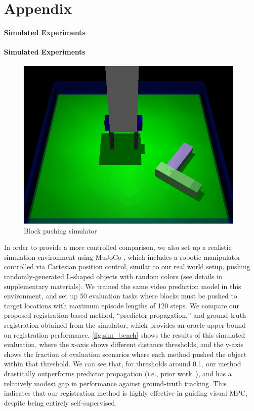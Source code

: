 \part*{Appendix}

\subsection*{Simulated Experiments}


\subsection*{Simulated Experiments}

\begin{figure}
	\centering
	\includegraphics[width=0.3\columnwidth]{images/simulator.png}
	\caption{\small{Block pushing simulator}}
	\label{fig:sim}
\end{figure}

In order to provide a more controlled comparison, we also set up a realistic simulation environment using MuJoCo \cite{todorov2012mujoco}, which includes a robotic manipulator controlled via Cartesian position control, similar to our real world setup, pushing randomly-generated L-shaped objects with random colors (see details in supplementary materials). 
We trained the same video prediction model in this environment, and set up 50 evaluation tasks where blocks must be pushed to target locations with maximum episode lengths of 120 steps. 
We  compare our proposed registration-based method, ``predictor propagation,'' and ground-truth registration obtained from the simulator, which provides an oracle upper bound on registration performance. \autoref{fig:sim_bench} shows the results of this simulated evaluation, where the x-axis shows different distance thresholds, and the y-axis shows the fraction of evaluation scenarios where each method pushed the object within that threshold. We can see that, for thresholds around 0.1, our method drastically outperforms predictor propagation (i.e., prior work~\cite{sna}), and has a relatively modest gap in performance against ground-truth tracking. This indicates that our registration method is highly effective in guiding visual MPC, despite being entirely self-supervised.

